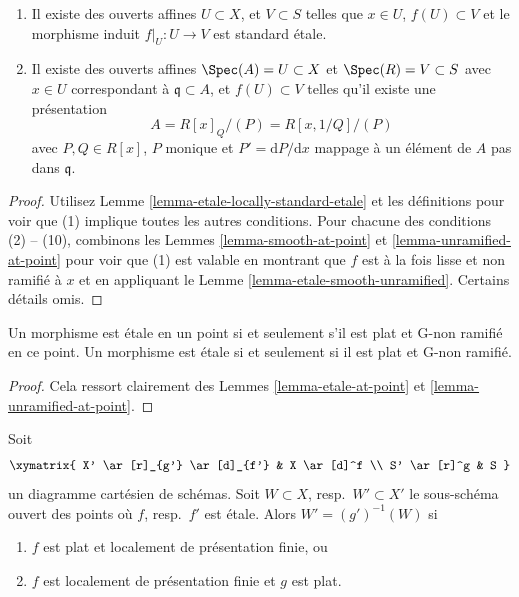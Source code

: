 \begin{lemma}
\begin{enumerate}
$$\begin{matrix}
\partial f_1/\partial x_1 &
\partial f_2/\partial x_1 &
\ldots &
\partial f_n/\partial x_1 \\
\partial f_1/\partial x_2 &
\partial f_2/\partial x_2 &
\ldots &
\partial f_n/\partial x_2 \\
\ldots & \ldots & \ldots & \ldots \\
\partial f_1/\partial x_n &
\partial f_2/\partial x_n &
\ldots &
\partial f_n/\partial x_n
\end{matrix}
\right)
$$
mappant à un élément de $A$ pas dans $\mathfrak q$.
\item Il existe des ouverts affines $U \subset X$,
et $V \subset S$ telles que $x \in U$, $f(U) \subset V$ et le morphisme
induit $f|_U : U \to V$ est standard étale.
\item Il existe des ouverts affines $\Spec(A) = U \subset X$
et $\Spec(R) = V \subset S$ avec $x \in U$ correspondant
à $\mathfrak q \subset A$, et $f(U) \subset V$ telles qu'il
existe une présentation
$$
A = R[x]_Q/(P) = R[x, 1/Q]/(P)
$$
avec $P, Q \in R[x]$, $P$ monique et $P' = \text{d}P/\text{d}x$ mappage à un élément
de $A$ pas dans $\mathfrak q$.
\end{enumerate}
\end{lemma}

\begin{proof}
Utilisez Lemme \ref{lemma-etale-locally-standard-etale} et les définitions
pour voir que (1) implique toutes les autres
conditions. Pour chacune des conditions (2)
-- (10), combinons les Lemmes \ref{lemma-smooth-at-point} et \ref{lemma-unramified-at-point}
pour voir que (1) est valable en montrant
que $f$ est à la fois lisse et non ramifié
à $x$ et en appliquant le Lemme \ref{lemma-etale-smooth-unramified}. Certains
détails omis.
\end{proof}

\begin{lemma}
\label{lemma-flat-unramified-etale}
Un morphisme est étale en un point si et seulement s'il est plat et G-non ramifié
en ce point. Un morphisme
est étale si et seulement si il est plat et G-non ramifié.
\end{lemma}

\begin{proof}
Cela ressort clairement des Lemmes \ref{lemma-etale-at-point}
et \ref{lemma-unramified-at-point}.
\end{proof}

\begin{lemma}
\label{lemma-set-points-where-fibres-etale}
Soit
$$
\xymatrix{
X' \ar[r]_{g'} \ar[d]_{f'} & X \ar[d]^f \\
S' \ar[r]^g & S
}
$$
un diagramme cartésien de schémas. Soit $W \subset X$, resp.\ $W' \subset X'$ le sous-schéma
ouvert des points où $f$, resp.\ $f'$ est étale.
Alors $W' = (g')^{-1}(W)$ si
\begin{enumerate}
\item $f$ est plat et localement de présentation finie, ou
\item $f$ est localement de présentation finie et $g$ est plat.
\end{enumerate}
\end{lemma}

